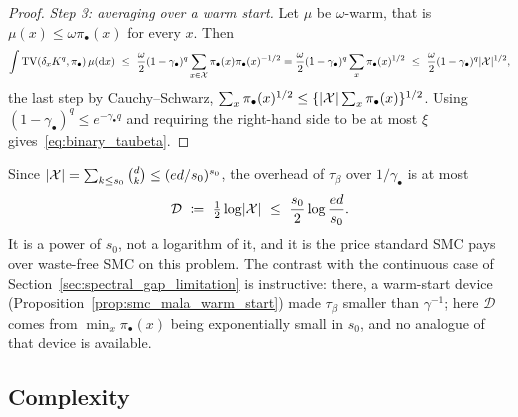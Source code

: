 \documentclass[aos]{imsart}%
\DeclarePairedDelimiter{\abs}{\lvert}{\rvert}
\newcommand{\TV}[0]{\textup{TV}}
\newcommand{\ambientspace}[0]{\mathcal{X}}
\newcommand{\dd}[0]{\mathrm{d}}
\theoremstyle{plain}
\theoremstyle{definition}
\begin{document}
\begin{proof}
        \emph{Step 3: averaging over a warm start.} Let $\mu$ be
        $\omega$-warm, that is $\mu(x)\leq\omega\pi_\bullet(x)$ for every $x$.
        Then
        \begin{equation*}
            \int\TV(\delta_xK^{q},\pi_\bullet)\,\mu(\dd x)
            \ \leq\ \frac{\omega}{2}(1-\gamma_\bullet)^{q}
            \sum_{x\in\ambientspace}\pi_\bullet(x)\pi_\bullet(x)^{-1/2}
            =\frac{\omega}{2}(1-\gamma_\bullet)^{q}
            \sum_{x}\pi_\bullet(x)^{1/2}
            \ \leq\ \frac{\omega}{2}(1-\gamma_\bullet)^{q}
            \abs{\ambientspace}^{1/2},
        \end{equation*}
        the last step by Cauchy--Schwarz,
        $\sum_x\pi_\bullet(x)^{1/2}\leq\{\abs{\ambientspace}
        \sum_x\pi_\bullet(x)\}^{1/2}$. Using $(1-\gamma_\bullet)^{q}\leq
        e^{-\gamma_\bullet q}$ and requiring the right-hand side to be at most
        $\xi$ gives~\eqref{eq:binary_taubeta}.
    \end{proof}

    Since
    $\abs{\ambientspace}=\sum_{k\leq s_0}\binom dk\leq(ed/s_0)^{s_0}$, the
    overhead of $\tau_\beta$ over $1/\gamma_\bullet$ is at most
    \begin{equation}
        \label{eq:binary_D}
        \mathcal{D}\ \coloneq\ \tfrac12\log\abs{\ambientspace}
        \ \leq\ \frac{s_0}{2}\log\frac{ed}{s_0} .
    \end{equation}
    It is a power of $s_0$, not a logarithm of it, and it is the price standard
    SMC pays over waste-free SMC on this problem. The contrast with the
    continuous case of Section~\ref{sec:spectral_gap_limitation} is
    instructive: there, a warm-start device
    (Proposition~\ref{prop:smc_mala_warm_start}) made $\tau_\beta$ smaller than
    $\gamma^{-1}$; here $\mathcal D$ comes from $\min_x\pi_\bullet(x)$ being
    exponentially small in $s_0$, and no analogue of that device is available.


    \subsection{Complexity}
    \label{sub:binary_complexity}
\end{document}
